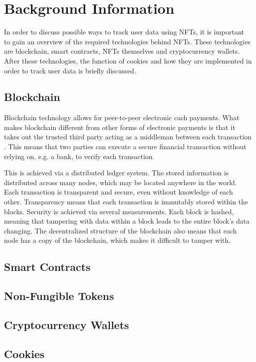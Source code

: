 \chapter{Background Information}
\label{ch:background}
In order to discuss possible ways to track user data using NFTs, it is important to gain an overview of the required technologies behind NFTs. These technologies are blockchain, smart contracts, NFTs themselves and cryptocurrency wallets. After these technologies, the function of cookies and how they are implemented in order to track user data is briefly discussed.




%
%
\section{Blockchain}
\label{sec:background:blockchain}
Blockchain technology allows for peer-to-peer electronic cash payments. What makes blockchain different from other forms of electronic payments is that it takes out the trusted third party acting as a middleman between each transaction \cite{bitcoin}. This means that two parties can execute a secure financial transaction without relying on, e.g. a bank, to verify each transaction.

This is achieved via a distributed ledger system. The stored information is distributed across many nodes, which may be located anywhere in the world. Each transaction is transparent and secure, even without knowledge of each other. Transparency means that each transaction is immutably stored within the blocks. Security is achieved via several measurements. Each block is hashed, meaning that tampering with data within a block leads to the entire block's data changing. The decentralized structure of the blockchain also means that each node has a copy of the blockchain, which makes it difficult to tamper with.  \cite{blockchain}


%
%
\section{Smart Contracts}
\label{sec:background:smartcontracts}


%
%
\section{Non-Fungible Tokens}
\label{sec:background:nfts}


%
%
\section{Cryptocurrency Wallets}
\label{sec:background:wallets}


%
%
\section{Cookies}
\label{sec:background:cookies}



